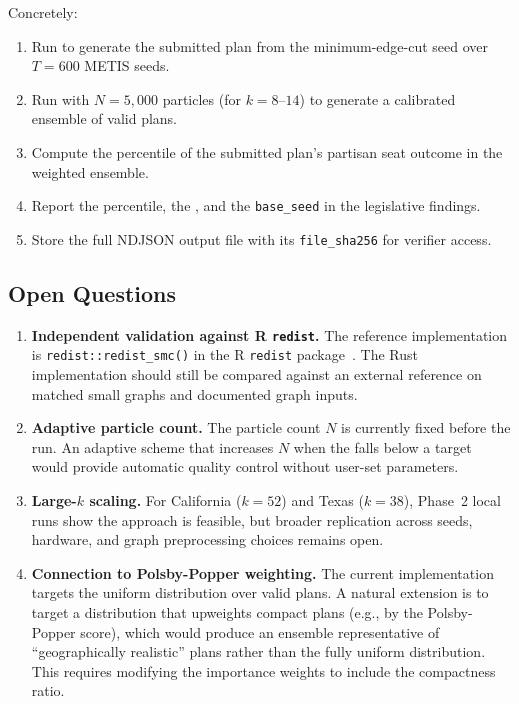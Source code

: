Concretely:
\begin{enumerate}
  \item Run \cs{} to generate the submitted plan from the
        minimum-edge-cut seed over $T = 600$ METIS seeds.
  \item Run \smc{} with $N = 5{,}000$ particles (for $k = 8$--$14$) to
        generate a calibrated ensemble of valid plans.
  \item Compute the percentile of the submitted plan's partisan seat outcome
        in the weighted \smc{} ensemble.
  \item Report the percentile, the \ess{}, and the \texttt{base\_seed} in
        the legislative findings.
  \item Store the full NDJSON output file with its \texttt{file\_sha256} for
        verifier access.
\end{enumerate}

\subsection{Open Questions}

\begin{enumerate}
  \item \textbf{Independent validation against R \texttt{redist}.}
        The reference implementation is \texttt{redist::redist\_smc()} in
        the R \texttt{redist} package~\citep{mccartan2023}. The Rust
        implementation should still be compared against an external reference
        on matched small graphs and documented graph inputs.

  \item \textbf{Adaptive particle count.}
        The particle count $N$ is currently fixed before the run.
        An adaptive scheme that increases $N$ when the \ess{} falls below
        a target would provide automatic quality control without user-set
        parameters.

  \item \textbf{Large-$k$ scaling.}
        For California ($k = 52$) and Texas ($k = 38$), Phase~2 local runs show
        the approach is feasible, but broader replication across seeds,
        hardware, and graph preprocessing choices remains open.

  \item \textbf{Connection to Polsby-Popper weighting.}
        The current implementation targets the uniform distribution over
        valid plans.
        A natural extension is to target a distribution that upweights compact
        plans (e.g., by the Polsby-Popper score), which would produce an
        ensemble representative of ``geographically realistic'' plans rather
        than the fully uniform distribution.
        This requires modifying the importance weights to include the
        compactness ratio.
\end{enumerate}

